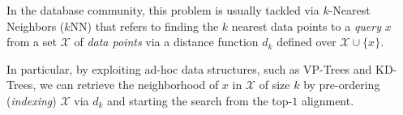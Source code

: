 In the database community, this problem is usually tackled via $k$-Nearest Neighbors ($k$NN) that refers to finding the $k$ nearest data points to a \textit{query} $x$ from a set $\mathcal{X}$ of \textit{data points} via a distance function $d_k$ defined over $\mathcal{X}\cup\{x\}$. {In particular, by exploiting ad-hoc data structures, such as VP-Trees and KD-Trees, %
we can retrieve the neighborhood of $x$ in $\mathcal{X}$ of size $k$ by pre-ordering (\textit{indexing}) $\mathcal{X}$ via $d_k$ and starting the search from the top-$1$ alignment.


%	


		
}
